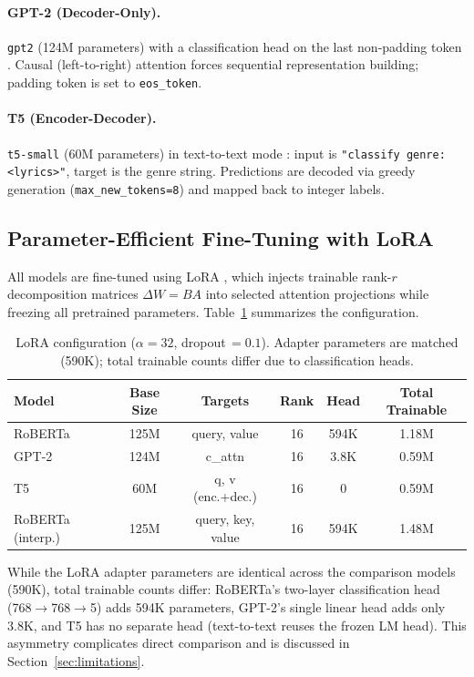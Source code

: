 \documentclass[11pt,a4paper]{article}
\begin{document}
\paragraph{GPT-2 (Decoder-Only).}
\texttt{gpt2} (124M parameters) with a classification head on the
last non-padding token \citep{radford2019language}.
Causal (left-to-right) attention forces sequential representation
building; padding token is set to \texttt{eos\_token}.

\paragraph{T5 (Encoder-Decoder).}
\texttt{t5-small} (60M parameters) in text-to-text mode
\citep{raffel2020exploring}: input is
\texttt{"classify genre: <lyrics>"}, target is the genre string.
Predictions are decoded via greedy generation
(\texttt{max\_new\_tokens=8}) and mapped back to integer labels.

\subsection{Parameter-Efficient Fine-Tuning with LoRA}

All models are fine-tuned using LoRA \citep{hu2022lora}, which injects
trainable rank-$r$ decomposition matrices $\Delta W = BA$ into
selected attention projections while freezing all pretrained parameters.
Table~\ref{tab:lora} summarizes the configuration.

\begin{table}[ht]
\centering
\caption{LoRA configuration ($\alpha=32$, dropout$\,=0.1$).
Adapter parameters are matched (590K); total trainable counts differ
due to classification heads.}
\label{tab:lora}
\begin{tabular}{lccccc}
\toprule
\textbf{Model} & \textbf{Base Size} & \textbf{Targets} & \textbf{Rank}
& \textbf{Head} & \textbf{Total Trainable} \\
\midrule
RoBERTa & 125M & query, value & 16 & 594K & 1.18M \\
GPT-2 & 124M & c\_attn & 16 & 3.8K & 0.59M \\
T5 & 60M & q, v (enc.+dec.) & 16 & 0 & 0.59M \\
\midrule
RoBERTa (interp.) & 125M & query, key, value & 16 & 594K & 1.48M \\
\bottomrule
\end{tabular}
\end{table}

While the LoRA adapter parameters are identical across the comparison
models (590K), total trainable counts differ:
RoBERTa's two-layer classification head (768$\to$768$\to$5) adds 594K
parameters, GPT-2's single linear head adds only 3.8K, and T5 has no
separate head (text-to-text reuses the frozen LM head).
This asymmetry complicates direct comparison and is discussed in
Section~\ref{sec:limitations}.
\end{document}
